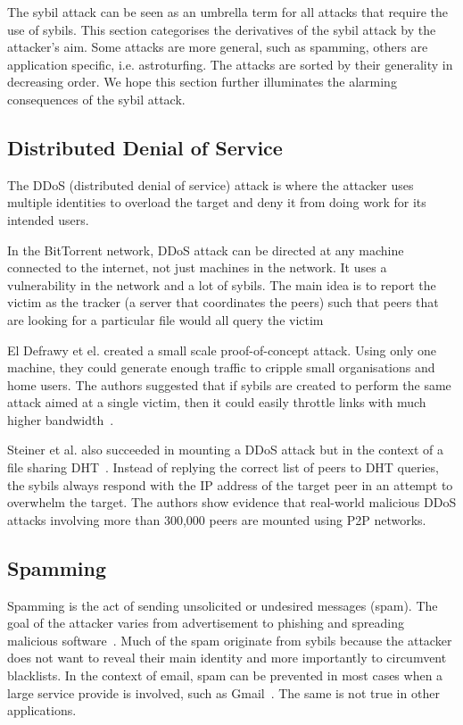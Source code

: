 The sybil attack can be seen as an umbrella term for all attacks that require
the use of sybils. This section categorises the derivatives of the sybil attack
by the attacker's aim. Some attacks are more general, such as spamming, others
are application specific, i.e. astroturfing. The attacks are sorted by their
generality in decreasing order. We hope this section further illuminates the
alarming consequences of the sybil attack.

\subsection{Distributed Denial of Service}
The DDoS (distributed denial of service) attack is where the attacker uses
multiple identities to overload the target and deny it from doing work for its
intended users.

In the BitTorrent network, DDoS attack can be directed at any machine connected
to the internet, not just machines in the network. It uses a vulnerability in
the network and a lot of sybils. The main idea is to report the victim as the
tracker (a server that coordinates the peers) such that peers that are looking
for a particular file would all query the victim~\cite{sia2006ddos}

El Defrawy et el. created a small scale proof-of-concept attack.
Using only one machine, they could generate enough traffic to cripple small
organisations and home users. The authors suggested that if sybils are created
to perform the same attack aimed at a single victim, then it could easily
throttle links with much higher bandwidth~\cite{el2007bottorrent}.

Steiner et al. also succeeded in mounting a DDoS attack but in the context of a
file sharing DHT~\cite{steiner2007exploiting}. Instead of replying the correct
list of peers to DHT queries, the sybils always respond with the IP address of
the target peer in an attempt to overwhelm the target. The authors show evidence
that real-world malicious DDoS attacks involving more than 300,000 peers are
mounted using P2P networks.

\subsection{Spamming}
Spamming is the act of sending unsolicited or undesired messages (spam). The
goal of the attacker varies from advertisement to phishing and spreading
malicious software~\cite{twittermalware1, twittermalware2}. Much of the spam
originate from sybils because the attacker does not want to reveal their main
identity and more importantly to circumvent blacklists. In the context of email,
spam can be prevented in most cases when a large service provide is involved,
such as Gmail~\cite{adwords}. The same is not true in other applications.

